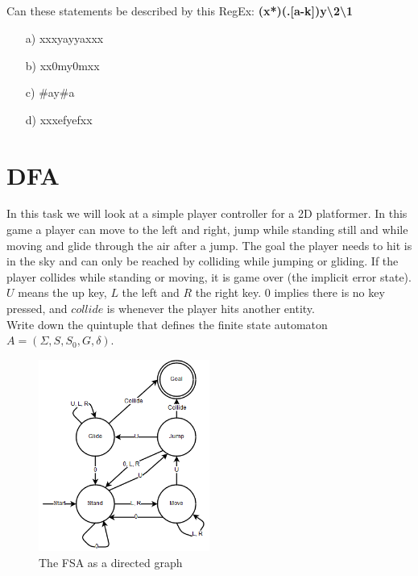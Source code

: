 \subsection{}
Can these statements be described by this RegEx: \textbf{(x*)(.[a-k])y\textbackslash2\textbackslash1}
\begin{itemize}
\item[a)] xxxyayyaxxx 
\item[b)] xx0my0mxx 
\item[c)] \#ay\#a 
\item[d)] xxxefyefxx 
\end{itemize}

\section{DFA}
\FloatBarrier
In this task we will look at a simple player controller for a 2D platformer. In this game a player can move to the left and right, jump while standing still and while moving and glide through the air after a jump. The goal the player needs to hit is in the sky and can only be reached by colliding while jumping or gliding. If the player collides while standing or moving, it is game over (the implicit error state). \\
$U$ means the up key, $L$ the left and $R$ the right key. $0$ implies there is no key pressed, and $collide$ is whenever the player hits another entity.\\
Write down the quintuple that defines the finite state automaton $A = (\Sigma, S, S_0, G, \delta)$.

\begin{figure}[h!]
\center
\includegraphics[width=0.5\textwidth]{fsa}
\caption{The FSA as a directed graph}
\end{figure}

